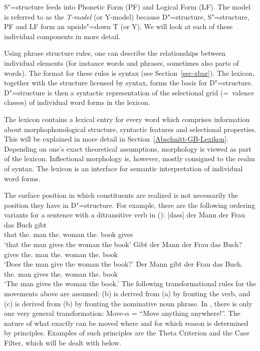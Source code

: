 S"=structure feeds into Phonetic Form (PF) and Logical Form (LF).
The model is referred to as the \emph{T-model} (or Y-model)
because D"=structure, S"=structure, PF and LF form an upside"=down T (or Y). We will
look at each of these individual components in more detail.

Using phrase structure rules, one can describe the relationships between individual elements (for
instance words and phrases, sometimes also parts of words). The format for these rules
is \xbar syntax (see Section~\ref{sec-xbar}). The lexicon, together with the structure licensed by \xbar syntax,
forms the basis for D"=structure. D"=structure is then a syntactic representation of the selectional grid (=~valence classes)
of individual word forms in the lexicon. 

The lexicon contains a lexical entry for every word which comprises information about morphophonological structure, syntactic features
and selectional properties. This will be explained in more detail in Section~\ref{Abschnitt-GB-Lexikon}. Depending on one's exact theoretical
assumptions, morphology is viewed as part of the lexicon. Inflectional morphology is, however, mostly consigned
to the realm of syntax. The lexicon is an interface for semantic interpretation of individual word forms.

The surface position in which constituents are realized is not necessarily the position they have in
D"=structure. For example, there are the following ordering variants for a sentence with a ditransitive verb in ():
\eal
\ex 
\gll {}[dass] der Mann der Frau das Buch gibt\\
	 {}\spacebr{}that the.\nom{} man the.\dat{} woman the.\acc{} book gives\\
\glt `that the man gives the woman the book'
\ex 
\gll Gibt der Mann der Frau das Buch?\\
	 gives the.\nom{} man the.\dat{} woman the.\acc{} book\\
\glt `Does the man give the woman the book?'
\ex 
\gll Der Mann gibt der Frau das Buch.\\
	 the.\nom{} man gives the.\dat{} woman the.\acc{} book\\
\glt `The man gives the woman the book.'
\zl
The following transformational rules for the movements above are assumed: (b) is derived from (a) by fronting the verb, 
and (c) is derived from (b) by fronting the nominative noun phrase. In \gbt, there is only one very general transformation:
Move-$\alpha$ = ``Move anything anywhere!''. The nature of what exactly can be moved where and for which reason is determined
by principles. Examples of such principles are the Theta Criterion and the Case Filter, which will be
dealt with below.

